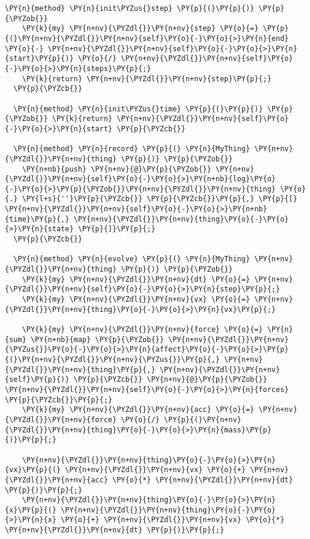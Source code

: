 \begin{Verbatim}[commandchars=\\\{\}]
  \PY{n}{method} \PY{n}{init\PYZus{}step} \PY{p}{(}\PY{p}{)} \PY{p}{\PYZob{}}
    \PY{k}{my} \PY{n+nv}{\PYZdl{}}\PY{n+nv}{step} \PY{o}{=} \PY{p}{(}\PY{n+nv}{\PYZdl{}}\PY{n+nv}{self}\PY{o}{-}\PY{o}{>}\PY{n}{end} \PY{o}{-} \PY{n+nv}{\PYZdl{}}\PY{n+nv}{self}\PY{o}{-}\PY{o}{>}\PY{n}{start}\PY{p}{)} \PY{o}{/} \PY{n+nv}{\PYZdl{}}\PY{n+nv}{self}\PY{o}{-}\PY{o}{>}\PY{n}{steps}\PY{p}{;}
    \PY{k}{return} \PY{n+nv}{\PYZdl{}}\PY{n+nv}{step}\PY{p}{;}
  \PY{p}{\PYZcb{}}

  \PY{n}{method} \PY{n}{init\PYZus{}time} \PY{p}{(}\PY{p}{)} \PY{p}{\PYZob{}} \PY{k}{return} \PY{n+nv}{\PYZdl{}}\PY{n+nv}{self}\PY{o}{-}\PY{o}{>}\PY{n}{start} \PY{p}{\PYZcb{}}

  \PY{n}{method} \PY{n}{record} \PY{p}{(} \PY{n}{MyThing} \PY{n+nv}{\PYZdl{}}\PY{n+nv}{thing} \PY{p}{)} \PY{p}{\PYZob{}}
    \PY{n+nb}{push} \PY{n+nv}{@}\PY{p}{\PYZob{}} \PY{n+nv}{\PYZdl{}}\PY{n+nv}{self}\PY{o}{-}\PY{o}{>}\PY{n+nb}{log}\PY{o}{-}\PY{o}{>}\PY{p}{\PYZob{}}\PY{n+nv}{\PYZdl{}}\PY{n+nv}{thing} \PY{o}{.} \PY{l+s}{''}\PY{p}{\PYZcb{}} \PY{p}{\PYZcb{}}\PY{p}{,} \PY{p}{[} \PY{n+nv}{\PYZdl{}}\PY{n+nv}{self}\PY{o}{-}\PY{o}{>}\PY{n+nb}{time}\PY{p}{,} \PY{n+nv}{\PYZdl{}}\PY{n+nv}{thing}\PY{o}{-}\PY{o}{>}\PY{n}{state} \PY{p}{]}\PY{p}{;}
  \PY{p}{\PYZcb{}}

  \PY{n}{method} \PY{n}{evolve} \PY{p}{(} \PY{n}{MyThing} \PY{n+nv}{\PYZdl{}}\PY{n+nv}{thing} \PY{p}{)} \PY{p}{\PYZob{}}
    \PY{k}{my} \PY{n+nv}{\PYZdl{}}\PY{n+nv}{dt} \PY{o}{=} \PY{n+nv}{\PYZdl{}}\PY{n+nv}{self}\PY{o}{-}\PY{o}{>}\PY{n}{step}\PY{p}{;}
    \PY{k}{my} \PY{n+nv}{\PYZdl{}}\PY{n+nv}{vx} \PY{o}{=} \PY{n+nv}{\PYZdl{}}\PY{n+nv}{thing}\PY{o}{-}\PY{o}{>}\PY{n}{vx}\PY{p}{;}

    \PY{k}{my} \PY{n+nv}{\PYZdl{}}\PY{n+nv}{force} \PY{o}{=} \PY{n}{sum} \PY{n+nb}{map} \PY{p}{\PYZob{}} \PY{n+nv}{\PYZdl{}}\PY{n+nv}{\PYZus{}}\PY{o}{-}\PY{o}{>}\PY{n}{affect}\PY{o}{-}\PY{o}{>}\PY{p}{(}\PY{n+nv}{\PYZdl{}}\PY{n+nv}{\PYZus{}}\PY{p}{,} \PY{n+nv}{\PYZdl{}}\PY{n+nv}{thing}\PY{p}{,} \PY{n+nv}{\PYZdl{}}\PY{n+nv}{self}\PY{p}{)} \PY{p}{\PYZcb{}} \PY{n+nv}{@}\PY{p}{\PYZob{}} \PY{n+nv}{\PYZdl{}}\PY{n+nv}{self}\PY{o}{-}\PY{o}{>}\PY{n}{forces} \PY{p}{\PYZcb{}}\PY{p}{;}
    \PY{k}{my} \PY{n+nv}{\PYZdl{}}\PY{n+nv}{acc} \PY{o}{=} \PY{n+nv}{\PYZdl{}}\PY{n+nv}{force} \PY{o}{/} \PY{p}{(}\PY{n+nv}{\PYZdl{}}\PY{n+nv}{thing}\PY{o}{-}\PY{o}{>}\PY{n}{mass}\PY{p}{)}\PY{p}{;}

    \PY{n+nv}{\PYZdl{}}\PY{n+nv}{thing}\PY{o}{-}\PY{o}{>}\PY{n}{vx}\PY{p}{(} \PY{n+nv}{\PYZdl{}}\PY{n+nv}{vx} \PY{o}{+} \PY{n+nv}{\PYZdl{}}\PY{n+nv}{acc} \PY{o}{*} \PY{n+nv}{\PYZdl{}}\PY{n+nv}{dt} \PY{p}{)}\PY{p}{;}
    \PY{n+nv}{\PYZdl{}}\PY{n+nv}{thing}\PY{o}{-}\PY{o}{>}\PY{n}{x}\PY{p}{(} \PY{n+nv}{\PYZdl{}}\PY{n+nv}{thing}\PY{o}{-}\PY{o}{>}\PY{n}{x} \PY{o}{+} \PY{n+nv}{\PYZdl{}}\PY{n+nv}{vx} \PY{o}{*} \PY{n+nv}{\PYZdl{}}\PY{n+nv}{dt} \PY{p}{)}\PY{p}{;}


\end{Verbatim}
